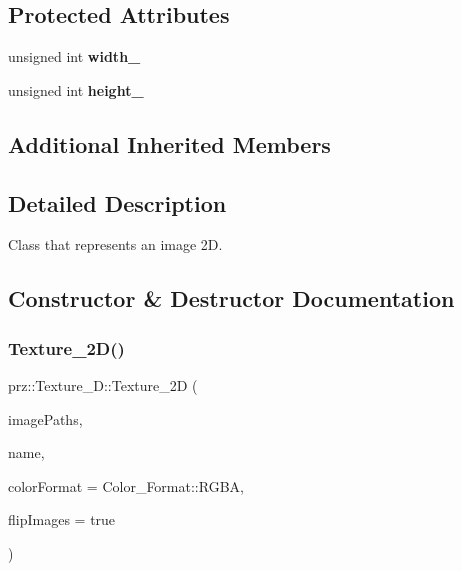 \subsection*{Protected Attributes}
\begin{DoxyCompactItemize}
\item 
\mbox{\label{classprz_1_1_texture__2_d_a2ced7051e8376aa95e9db8568300adb5}} 
unsigned int {\bfseries width\+\_\+}
\item 
\mbox{\label{classprz_1_1_texture__2_d_a4ea7a2c17109f801bf620eb5755ba876}} 
unsigned int {\bfseries height\+\_\+}
\end{DoxyCompactItemize}
\subsection*{Additional Inherited Members}


\subsection{Detailed Description}
Class that represents an image 2D. 



\subsection{Constructor \& Destructor Documentation}
\mbox{\label{classprz_1_1_texture__2_d_a954cc43fd1a1bc40866985749e795547}} 
\subsubsection{\texorpdfstring{Texture\_2D()}{Texture\_2D()}\hspace{0.1cm}{\footnotesize\ttfamily [1/2]}}
{\footnotesize\ttfamily prz\+::\+Texture\+\_\+D\+::\+Texture\+\_\+2D (\begin{DoxyParamCaption}\item[{P\+Buffer$<$ P\+String $>$ \&}]{image\+Paths,  }\item[{const P\+String \&}]{name,  }\item[{const Color\+\_\+\+Format \&}]{color\+Format = {\ttfamily Color\+\_\+Format\+:\+:RGBA},  }\item[{bool}]{flip\+Images = {\ttfamily true} }\end{DoxyParamCaption})}



